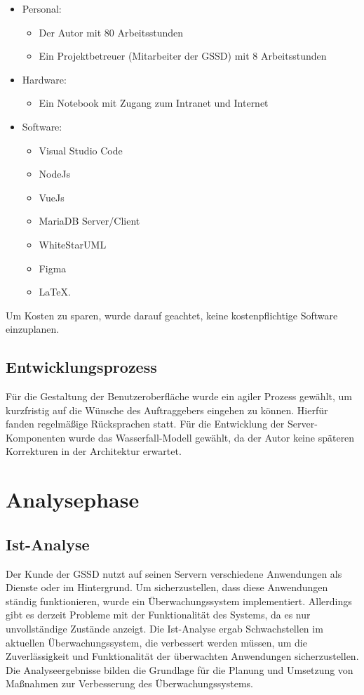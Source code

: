 \begin{flushleft}
\begin{itemize}
\item Personal:
\begin{itemize}
\item Der Autor mit 80 Arbeitsstunden
\item Ein Projektbetreuer (Mitarbeiter der \acs{GSSD}) mit 8 Arbeitsstunden
\end{itemize}
\item Hardware:
\begin{itemize}
\item Ein Notebook mit Zugang zum Intranet und Internet
\end{itemize}
\item Software:
\begin{itemize}
\item Visual Studio Code
\item NodeJs
\item VueJs
\item MariaDB Server/Client
\item WhiteStarUML
\item Figma
\item \LaTeX.
\end{itemize}
\end{itemize}

Um Kosten zu sparen, wurde darauf geachtet, keine kostenpflichtige Software einzuplanen.

\subsection{Entwicklungsprozess}
Für die Gestaltung der Benutzeroberfläche wurde ein agiler Prozess gewählt, um kurzfristig auf die Wünsche des Auftraggebers eingehen zu können. Hierfür fanden regelmäßige Rücksprachen statt.
Für die Entwicklung der Server-Komponenten wurde das Wasserfall-Modell gewählt, da der Autor keine späteren Korrekturen in der Architektur erwartet.


\section{Analysephase}
\subsection{Ist-Analyse}
Der Kunde der GSSD nutzt auf seinen Servern verschiedene Anwendungen als Dienste oder im Hintergrund.
Um sicherzustellen, dass diese Anwendungen ständig funktionieren, wurde ein Überwachungssystem implementiert.
Allerdings gibt es derzeit Probleme mit der Funktionalität des Systems, da es nur unvollständige Zustände anzeigt.
Die Ist-Analyse ergab Schwachstellen im aktuellen Überwachungssystem, die verbessert werden müssen, um die Zuverlässigkeit und Funktionalität der überwachten Anwendungen sicherzustellen.
Die Analyseergebnisse bilden die Grundlage für die Planung und Umsetzung von Maßnahmen zur Verbesserung des Überwachungssystems.


\end{flushleft}
